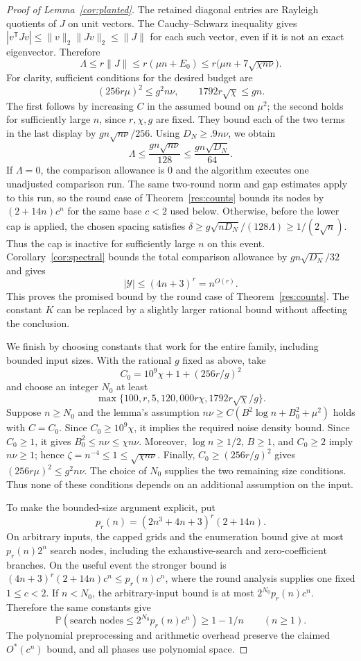 \documentclass[11pt,a4paper]{article}
\theoremstyle{definition}
\theoremstyle{remark}
\newcommand{\Ostar}{O^{*}}
\newcommand{\Prb}{\mathbb P}
\begin{document}
\begin{proof}[Proof of Lemma~\ref{cor:planted}]
The retained diagonal entries are Rayleigh quotients of $J$ on unit
vectors. The Cauchy--Schwarz inequality gives
$|v^{\mathsf T}Jv|\le\|v\|_2\|Jv\|_2\le\|J\|$ for each such
vector, even if it is not an exact eigenvector. Therefore
\[
 \Lambda\le r\|J\|\le r(\mu n+E_0)
             \le r\bigl(\mu n+7\sqrt{\chi n\nu}\bigr).
\]
For clarity, sufficient conditions for the desired budget are
\[
 (256r\mu)^2\le g^2n\nu,\qquad
 1792r\sqrt\chi\le gn.
\]
The first follows by increasing $C$ in the assumed bound on $\mu^2$;
the second holds for sufficiently large $n$, since $r,\chi,g$ are fixed.
They bound each of the two terms in the last display by
$gn\sqrt{n\nu}/256$. Using $D_N\ge.9n\nu$, we obtain
\[
 \Lambda\le\frac{gn\sqrt{n\nu}}{128}
          \le\frac{gn\sqrt{D_N}}{64}.
\]
If $\Lambda=0$, the comparison allowance is $0$ and the algorithm
executes one unadjusted comparison run. The same two-round norm and
gap estimates apply to this run, so the round case of
Theorem~\ref{res:counts} bounds its nodes by $(2+14n)c^n$ for the same
base $c<2$ used below. Otherwise, before the lower cap is applied, the chosen
spacing satisfies
$\delta\ge g\sqrt{nD_N}/(128\Lambda)\ge1/(2\sqrt n)$.
Thus the cap is inactive for sufficiently large $n$ on this event.
Corollary~\ref{cor:spectral} bounds the total comparison allowance
by $gn\sqrt{D_N}/32$ and gives
\[
 |\mathcal Y|\le(4n+3)^r=n^{O(r)}.
\]
This proves the promised bound by the round case of
Theorem~\ref{res:counts}. The constant $K$ can be replaced by a
slightly larger rational bound without affecting the conclusion.

We finish by choosing constants that work for the entire family, including
bounded input sizes. With the rational $g$ fixed as above, take
\[
 C_0=10^9\chi+1+(256r/g)^2
\]
and choose an integer $N_0$ at least
\[
 \max\{100,r,5{,}120{,}000r\chi,1792r\sqrt\chi/g\}.
\]
Suppose $n\ge N_0$ and the lemma's assumption
$n\nu\ge C(B^2\log n+B_0^2+\mu^2)$ holds with $C=C_0$.
Since $C_0\ge10^9\chi$, it implies the required noise density bound.
Since $C_0\ge1$, it gives $B_0^2\le n\nu\le\chi n\nu$.
Moreover, $\log n\ge1/2$, $B\ge1$, and $C_0\ge2$ imply $n\nu\ge1$;
hence $\zeta=n^{-4}\le1\le\sqrt{\chi n\nu}$.
Finally, $C_0\ge(256r/g)^2$ gives
$(256r\mu)^2\le g^2n\nu$. The choice of $N_0$ supplies the two
remaining size conditions. Thus none of these conditions depends on an
additional assumption on the input.

To make the bounded-size argument explicit, put
\[
 p_r(n)=(2n^3+4n+3)^r(2+14n).
\]
On arbitrary inputs, the capped grids and the enumeration bound give at
most $p_r(n)2^n$ search nodes, including the exhaustive-search and
zero-coefficient branches. On the useful event the stronger bound is
$(4n+3)^r(2+14n)c^n\le p_r(n)c^n$, where the round analysis supplies
one fixed $1\le c<2$. If $n<N_0$, the arbitrary-input bound is at most
$2^{N_0}p_r(n)c^n$. Therefore the same constants give
\[
 \Prb\!\left(\text{search nodes}\le2^{N_0}p_r(n)c^n\right)
 \ge1-1/n\qquad(n\ge1).
\]
The polynomial preprocessing and arithmetic overhead preserve the claimed
$\Ostar(c^n)$ bound, and all phases use polynomial space.


\end{proof}
\end{document}
